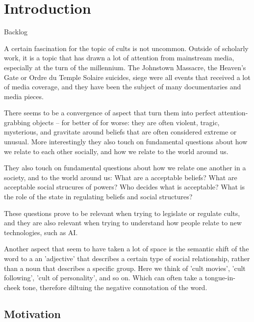 \chapter{Introduction}
\label{ch:introduction}

Backlog

A certain fascination for the topic of cults is not uncommon. Outside of scholarly work, it is a topic that has drawn a lot of attention from mainstream media, especially at the turn of the millennium. The Johnstown Massacre, the Heaven's Gate or Ordre du Temple Solaire suicides, siege were all events that received a lot of media coverage, and they have been the subject of many documentaries and media pieces.

There seems to be a convergence of aspect that turn them into perfect attention-grabbing objects – for better of for worse: they are often violent, tragic, mysterious, and gravitate around beliefs that are often considered extreme or unusual. More interestingly they also touch on fundamental questions about how we relate to each other socially, and how we relate to the world around us.

They also touch on fundamental questions about how we relate one another in a society, and to the world around us: What are a acceptable beliefs? What are acceptable social strucures of powers? Who decides what is acceptable? What is the role of the state in regulating beliefs and social structures?

These questions prove to be relevant when trying to legislate or regulate cults, and they are also relevant when trying to understand how people relate to new technologies, such as AI.

Another aspect that seem to have taken a lot of space is the semantic shift of the word to a an 'adjective' that describes a certain type of social relationship, rather than a noun that describes a specific group. Here we think of 'cult movies', 'cult following', 'cult of personality', and so on. Which can often take a tongue-in-cheek tone, therefore diltuing the negative connotation of the word.

\section{Motivation}
\label{sec:motivation}


